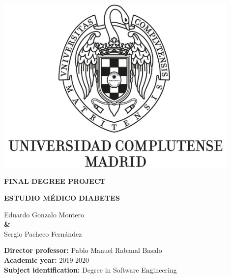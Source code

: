 \documentclass{report}
\begin{document}
\begin{titlepage}
        \clearpage
        
        \pagestyle{empty}
        \centering
        {\includegraphics[width=0.9\textwidth]{images/logo_UCM}}
    
        \vspace{1.5cm}
        
        {\huge\textbf{FINAL DEGREE PROJECT \\ }  }

        \vspace{0.5cm}
        
        {\huge\textbf{ESTUDIO MÉDICO DIABETES}  }
        
        \vspace{2.3cm}
    
        {\Large Eduardo Gonzalo Montero \\}
        \vspace{0.5cm}
        {\textbf \& \\}
        \vspace{0.5cm}
        {\Large Sergio Pacheco Fernández \\}
        
        \vspace{2.3cm}
        
        \raggedright
        {\Large \textbf{Director professor:} Pablo Manuel Rabanal Basalo \\}
        \vspace{0.1cm}
        {\Large\textbf {Academic year:} 2019-2020 \\}
        \vspace{0.1cm}
        {\Large\textbf {Subject identification: }Degree in Software Engineering \\}
    
        \clearpage
     \end{titlepage}

    \renewcommand{\contentsname}{Índice}
    \tableofcontents
    
    
    
    
     
    
    
    
    
    
    
\end{document}
